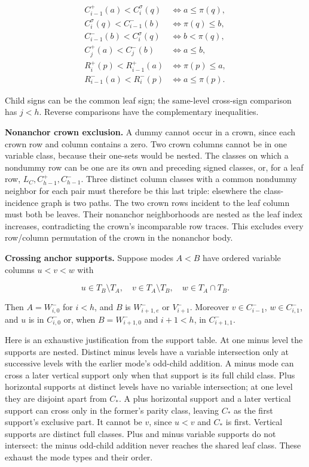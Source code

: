 \documentclass[11pt,letterpaper]{article}
\begin{document}
\[
\begin{aligned}
 C_{i-1}^+(a)<C_i^\sigma(q)&\iff a\le\pi(q),\\
 C_i^\sigma(q)<C_{i-1}^-(b)&\iff\pi(q)\le b,\\
 C_{i-1}^-(b)<C_i^\sigma(q)&\iff b<\pi(q),\\
 C_j^+(a)<C_j^-(b)&\iff a\le b,\\
 R_i^+(p)<R_{i-1}^+(a)&\iff\pi(p)\le a,\\
 R_{i-1}^-(a)<R_i^-(p)&\iff a\le\pi(p).
\end{aligned}
\]

Child signs can be the common leaf sign; the same-level cross-sign
comparison has \(j<h\). Reverse comparisons have the complementary
inequalities.

\textbf{Nonanchor crown exclusion.} A dummy cannot occur in a crown,
since each crown row and column contains a zero. Two crown columns
cannot be in one variable class, because their one-sets would be nested.
The classes on which a nondummy row can be one are its own and preceding
signed classes, or, for a leaf row, \(L_C,C_{h-1}^+,C_{h-1}^-\). Three
distinct column classes with a common nondummy neighbor for each pair
must therefore be this last triple: elsewhere the class-incidence graph
is two paths. The two crown rows incident to the leaf column must both
be leaves. Their nonanchor neighborhoods are nested as the leaf index
increases, contradicting the crown's incomparable row traces. This
excludes every row/column permutation of the crown in the nonanchor
body.

\textbf{Crossing anchor supports.} Suppose modes \(A<B\) have ordered
variable columns \(u<v<w\) with

\[
 u\in T_B\setminus T_A,\quad v\in T_A\setminus T_B,
 \quad w\in T_A\cap T_B.
\]

Then \(A=W_{i,0}^-\) for \(i<h\), and \(B\) is \(W_{i+1,e}^-\) or
\(V_{i+1}^-\). Moreover \(v\in C_{i-1}^-\), \(w\in C_{i,1}^-\), and
\(u\) is in \(C_{i,0}^-\) or, when \(B=W_{i+1,0}^-\) and \(i+1<h\), in
\(C_{i+1,1}^-\).

Here is an exhaustive justification from the support table. At one minus
level the supports are nested. Distinct minus levels have a variable
intersection only at successive levels with the earlier mode's odd-child
addition. A minus mode can cross a later vertical support only when that
support is its full child class. Plus horizontal supports at distinct
levels have no variable intersection; at one level they are disjoint
apart from \(C_*\). A plus horizontal support and a later vertical
support can cross only in the former's parity class, leaving \(C_*\) as
the first support's exclusive part. It cannot be \(v\), since \(u<v\)
and \(C_*\) is first. Vertical supports are distinct full classes. Plus
and minus variable supports do not intersect: the minus odd-child
addition never reaches the shared leaf class. These exhaust the mode
types and their order.
\end{document}
